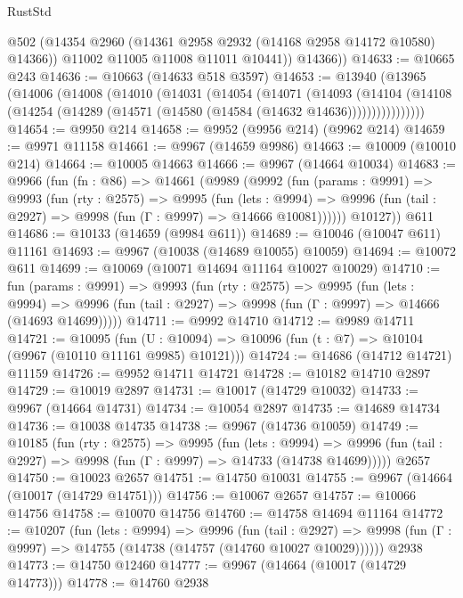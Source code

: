 \begin{lexlean}{RustStd}
\begin{coremodule}
            @502
            (@14354 @2960 (@14361 @2958 @2932 (@14168 @2958 @14172 @10580) @14366))
            @11002
            @11005
            @11008
            @11011
            @10441))
        @14366))
@14633 := @10665 @243
@14636 := @10663 (@14633 @518 @3597)
@14653 := @13940
    (@13965
      (@14006
        (@14008
          (@14010
            (@14031
              (@14054
                (@14071
                  (@14093
                    (@14104
                      (@14108 (@14254 (@14289 (@14571 (@14580 (@14584 (@14632 @14636))))))))))))))))
@14654 := @9950 @214
@14658 := @9952 (@9956 @214) (@9962 @214)
@14659 := @9971 @11158
@14661 := @9967 (@14659 @9986)
@14663 := @10009 (@10010 @214)
@14664 := @10005 @14663
@14666 := @9967 (@14664 @10034)
@14683 := @9966
    (fun (fn : @86) =>
    @14661
      (@9989
        (@9992
          (fun (params : @9991) =>
          @9993
            (fun (rty : @2575) =>
            @9995
              (fun (lets : @9994) =>
              @9996 (fun (tail : @2927) => @9998 (fun (Γ : @9997) => @14666 @10081))))))
        @10127))
    @611
@14686 := @10133 (@14659 (@9984 @611))
@14689 := @10046 (@10047 @611) @11161
@14693 := @9967 (@10038 (@14689 @10055) @10059)
@14694 := @10072 @611
@14699 := @10069 (@10071 @14694 @11164 @10027 @10029)
@14710 := fun (params : @9991) =>
  @9993
    (fun (rty : @2575) =>
    @9995
      (fun (lets : @9994) =>
      @9996 (fun (tail : @2927) => @9998 (fun (Γ : @9997) => @14666 (@14693 @14699)))))
@14711 := @9992 @14710
@14712 := @9989 @14711
@14721 := @10095
    (fun (U : @10094) => @10096 (fun (t : @7) => @10104 (@9967 (@10110 @11161 @9985) @10121)))
@14724 := @14686 (@14712 @14721) @11159
@14726 := @9952 @14711 @14721
@14728 := @10182 @14710 @2897
@14729 := @10019 @2897
@14731 := @10017 (@14729 @10032)
@14733 := @9967 (@14664 @14731)
@14734 := @10054 @2897
@14735 := @14689 @14734
@14736 := @10038 @14735
@14738 := @9967 (@14736 @10059)
@14749 := @10185
    (fun (rty : @2575) =>
    @9995
      (fun (lets : @9994) =>
      @9996 (fun (tail : @2927) => @9998 (fun (Γ : @9997) => @14733 (@14738 @14699)))))
    @2657
@14750 := @10023 @2657
@14751 := @14750 @10031
@14755 := @9967 (@14664 (@10017 (@14729 @14751)))
@14756 := @10067 @2657
@14757 := @10066 @14756
@14758 := @10070 @14756
@14760 := @14758 @14694 @11164
@14772 := @10207
    (fun (lets : @9994) =>
    @9996
      (fun (tail : @2927) =>
      @9998 (fun (Γ : @9997) => @14755 (@14738 (@14757 (@14760 @10027 @10029))))))
    @2938
@14773 := @14750 @12460
@14777 := @9967 (@14664 (@10017 (@14729 @14773)))
@14778 := @14760 @2938

\end{coremodule}
\end{lexlean}
